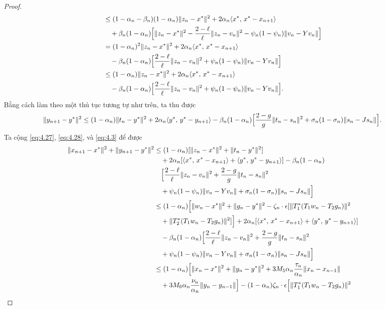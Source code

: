 \documentclass{MyBook}
\theoremstyle{plain}
\theoremstyle{definition}
\theoremstyle{remark}
\numberwithin{equation}{chapter}
\newcommand{\inp}[2]{\langle #1,\,#2\rangle}
\newcommand{\nm}[1]{\lVert #1\rVert}
\begin{document}
\begin{proof}
\begin{align}
&\le (1-\alpha_n-\beta_n)(1-\alpha_n)\nm{z_n-x^{*}}^2+2\alpha_n\inp{x^{*}}{x^{*}-x_{n+1}}\notag\\
&\quad +\beta_n(1-\alpha_n)\Bigl[\nm{z_n-x^{*}}^2-\frac{2-\ell}{\ell}\nm{z_n-v_n}^2-\psi_n(1-\psi_n)\nm{v_n-Yv_n}\Bigr]\notag\\
&= (1-\alpha_n)^2\nm{z_n-x^{*}}^2+2\alpha_n\inp{x^{*}}{x^{*}-x_{n+1}}\notag\\
&\quad -\beta_n(1-\alpha_n)\Bigl[\frac{2-\ell}{\ell}\nm{z_n-v_n}^2+\psi_n(1-\psi_n)\nm{v_n-Yv_n}\Bigr]\notag\\
&\le (1-\alpha_n)\nm{z_n-x^{*}}^2+2\alpha_n\inp{x^{*}}{x^{*}-x_{n+1}}\notag\\
&\quad -\beta_n(1-\alpha_n)\Bigl[\frac{2-\ell}{\ell}\nm{z_n-v_n}^2+\psi_n(1-\psi_n)\nm{v_n-Yv_n}\Bigr]. \label{eq:4.27}
\end{align}
Bằng cách làm theo một thủ tục tương tự như trên, ta thu được
\begin{equation}
\nm{y_{n+1}-y^{*}}^2\le(1-\alpha_n)\nm{t_n-y^{*}}^2+2\alpha_n\inp{y^{*}}{y^{*}-y_{n+1}}-\beta_n(1-\alpha_n)\Bigl[\frac{2-g}{g}\nm{t_n-s_n}^2+\sigma_n(1-\sigma_n)\nm{s_n-Js_n}\Bigr]. \label{eq:4.28}
\end{equation}
Ta cộng \eqref{eq:4.27}, \eqref{eq:4.28}, và \eqref{eq:4.3} để được
\begin{align*}
\nm{x_{n+1}-x^{*}}^2+\nm{y_{n+1}-y^{*}}^2 &\le (1-\alpha_n)[\nm{z_n-x^{*}}^2+\nm{t_n-y^{*}}^2]\\
&\quad +2\alpha_n[\inp{x^{*}}{x^{*}-x_{n+1}}+\inp{y^{*}}{y^{*}-y_{n+1}}]-\beta_n(1-\alpha_n)\\
&\quad \Bigl[\frac{2-\ell}{\ell}\nm{z_n-v_n}^2+\frac{2-g}{g}\nm{t_n-s_n}^2\\
&\quad +\psi_n(1-\psi_n)\nm{v_n-Yv_n}+\sigma_n(1-\sigma_n)\nm{s_n-Js_n}\Bigr]\\
&\le (1-\alpha_n)\Bigl[\nm{w_n-x^{*}}^2+\nm{g_n-y^{*}}^2-\zeta_n\cdot\epsilon[\nm{T_1^{*}(T_1w_n-T_2g_n)}^2\\
&\quad +\nm{T_2^{*}(T_1w_n-T_2g_n)}^2]\Bigr]+2\alpha_n[\inp{x^{*}}{x^{*}-x_{n+1}}+\inp{y^{*}}{y^{*}-y_{n+1}}]\\
&\quad -\beta_n(1-\alpha_n)\Bigl[\frac{2-\ell}{\ell}\nm{z_n-v_n}^2+\frac{2-g}{g}\nm{t_n-s_n}^2\\
&\quad +\psi_n(1-\psi_n)\nm{v_n-Yv_n}+\sigma_n(1-\sigma_n)\nm{s_n-Js_n}\Bigr]\\
&\le (1-\alpha_n)\Bigl[\nm{x_n-x^{*}}^2+\nm{y_n-y^{*}}^2+3M_5\alpha_n\frac{\tau_n}{\alpha_n}\nm{x_n-x_{n-1}}\\
&\quad +3M_6\alpha_n\frac{\nu_n}{\alpha_n}\nm{y_n-y_{n-1}}\Bigr]-(1-\alpha_n)\zeta_n\cdot\epsilon\Bigl[\nm{T_1^{*}(T_1w_n-T_2g_n)}^2\\

\end{align*}
\end{proof}
\end{document}
